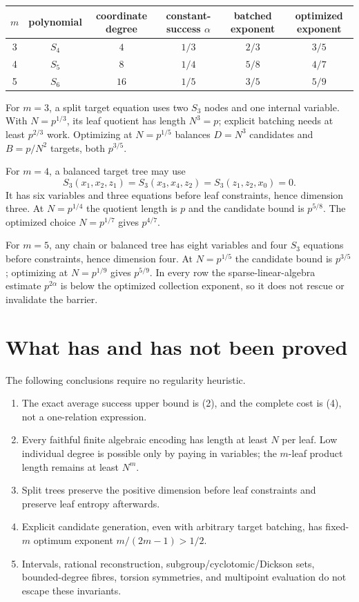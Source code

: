 \documentclass[11pt]{article}
\begin{document}
\begin{center}
\small
\begin{tabular}{c c c c c c}
\toprule
$m$ & polynomial & coordinate degree & constant-success $\alpha$
& batched exponent & optimized exponent\\
\midrule
3 & $S_4$ & $4$ & $1/3$ & $2/3$ & $3/5$\\
4 & $S_5$ & $8$ & $1/4$ & $5/8$ & $4/7$\\
5 & $S_6$ & $16$& $1/5$ & $3/5$ & $5/9$\\
\bottomrule
\end{tabular}
\end{center}

For $m=3$, a split target equation uses two $S_3$ nodes and one internal
variable.  With $N=p^{1/3}$, its leaf quotient has length $N^3=p$; explicit
batching needs at least $p^{2/3}$ work.  Optimizing at $N=p^{1/5}$ balances
$D=N^3$ candidates and $B=p/N^2$ targets, both $p^{3/5}$.

For $m=4$, a balanced target tree may use
\[
 S_3(x_1,x_2,z_1)=S_3(x_3,x_4,z_2)=S_3(z_1,z_2,x_0)=0.
\]
It has six variables and three equations before leaf constraints, hence
dimension three.  At $N=p^{1/4}$ the quotient length is $p$ and the candidate
bound is $p^{5/8}$.  The optimized choice $N=p^{1/7}$ gives $p^{4/7}$.

For $m=5$, any chain or balanced tree has eight variables and four $S_3$
equations before constraints, hence dimension four.  At $N=p^{1/5}$ the
candidate bound is $p^{3/5}$; optimizing at $N=p^{1/9}$ gives $p^{5/9}$.
In every row the sparse-linear-algebra estimate $p^{2\alpha}$ is below the
optimized collection exponent, so it does not rescue or invalidate the
barrier.

\section{What has and has not been proved} %

The following conclusions require no regularity heuristic.
\begin{enumerate}
 \item The exact average success upper bound is (2), and the complete cost is
       (4), not a one-relation expression.
 \item Every faithful finite algebraic encoding has length at least $N$ per
       leaf.  Low individual degree is possible only by paying in variables;
       the $m$-leaf product length remains at least $N^m$.
 \item Split trees preserve the positive dimension before leaf constraints and
       preserve leaf entropy afterwards.
 \item Explicit candidate generation, even with arbitrary target batching,
       has fixed-$m$ optimum exponent $m/(2m-1)>1/2$.
 \item Intervals, rational reconstruction, subgroup/cyclotomic/Dickson sets,
       bounded-degree fibres, torsion symmetries, and multipoint evaluation do
       not escape these invariants.
\end{enumerate}
\end{document}
